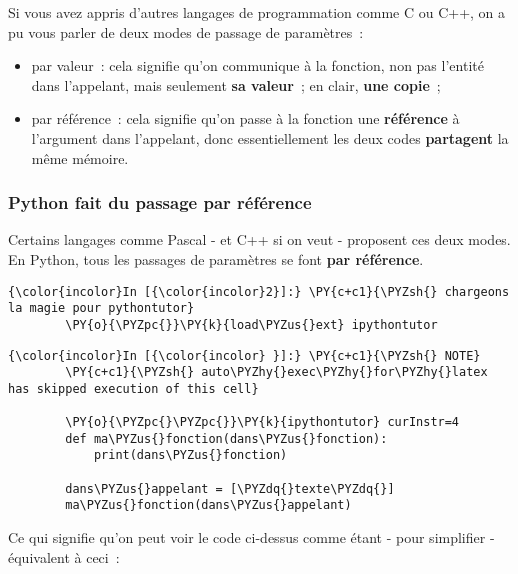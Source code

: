     Si vous avez appris d'autres langages de programmation comme C ou C++,
on a pu vous parler de deux modes de passage de paramètres~:

\begin{itemize}
\tightlist
\item
  par valeur~: cela signifie qu'on communique à la fonction, non pas
  l'entité dans l'appelant, mais seulement \textbf{sa valeur}~; en
  clair, \textbf{une copie}~;
\item
  par référence~: cela signifie qu'on passe à la fonction une
  \textbf{référence} à l'argument dans l'appelant, donc essentiellement
  les deux codes \textbf{partagent} la même mémoire.
\end{itemize}

    \hypertarget{python-fait-du-passage-par-ruxe9fuxe9rence}{%
\subsubsection{Python fait du passage par
référence}\label{python-fait-du-passage-par-ruxe9fuxe9rence}}

    Certains langages comme Pascal - et C++ si on veut - proposent ces deux
modes. En Python, tous les passages de paramètres se font \textbf{par
référence}.

    \begin{Verbatim}[commandchars=\\\{\}]
{\color{incolor}In [{\color{incolor}2}]:} \PY{c+c1}{\PYZsh{} chargeons la magie pour pythontutor}
        \PY{o}{\PYZpc{}}\PY{k}{load\PYZus{}ext} ipythontutor
\end{Verbatim}


    \begin{Verbatim}[commandchars=\\\{\}]
{\color{incolor}In [{\color{incolor} }]:} \PY{c+c1}{\PYZsh{} NOTE}
        \PY{c+c1}{\PYZsh{} auto\PYZhy{}exec\PYZhy{}for\PYZhy{}latex has skipped execution of this cell}
        
        \PY{o}{\PYZpc{}\PYZpc{}}\PY{k}{ipythontutor} curInstr=4
        def ma\PYZus{}fonction(dans\PYZus{}fonction):
            print(dans\PYZus{}fonction)
            
        dans\PYZus{}appelant = [\PYZdq{}texte\PYZdq{}]
        ma\PYZus{}fonction(dans\PYZus{}appelant)
\end{Verbatim}


    Ce qui signifie qu'on peut voir le code ci-dessus comme étant - pour
simplifier - équivalent à ceci~:

